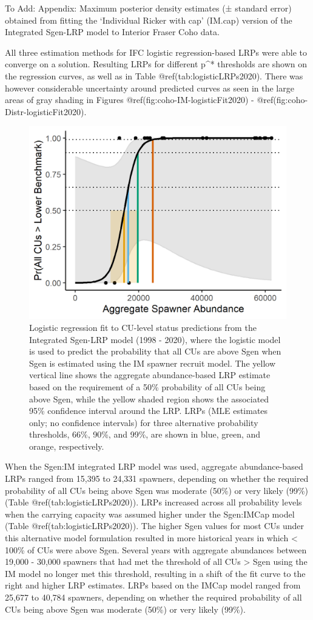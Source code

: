 \documentclass[
]{article}
\begin{document}
To Add: Appendix: Maximum posterior density estimates (± standard error)
obtained from fitting the `Individual Ricker with cap' (IM.cap) version
of the Integrated Sgen-LRP model to Interior Fraser Coho data.

All three estimation methods for IFC logistic regression-based LRPs were
able to converge on a solution. Resulting LRPs for different p\^{}*
thresholds are shown on the regression curves, as well as in Table
@ref(tab:logisticLRPs2020). There was however considerable uncertainty
around predicted curves as seen in the large areas of gray shading in
Figures @ref(fig:coho-IM-logisticFit2020) -
@ref(fig:coho-Distr-logisticFit2020).

\begin{figure}

{\centering \includegraphics[width=0.5\linewidth]{figure/coho-IM2020-LogisticLRP} 

}

\caption{Logistic regression fit to CU-level status predictions from the Integrated Sgen-LRP model (1998 - 2020), where the logistic model is used to predict the probability that all CUs are above Sgen when Sgen is estimated using the IM spawner recruit model. The yellow vertical line shows the aggregate abundance-based LRP estimate based on the requirement of a 50\% probability of all CUs being above Sgen, while the yellow shaded region shows the associated 95\% confidence interval around the LRP. LRPs (MLE estimates only; no confidence intervals) for three alternative probability thresholds, 66\%, 90\%, and 99\%, are shown in blue, green, and orange, respectively.}\label{fig:coho-IM-logisticFit2020}
\end{figure}

When the Sgen:IM integrated LRP model was used, aggregate
abundance-based LRPs ranged from 15,395 to 24,331 spawners, depending on
whether the required probability of all CUs being above Sgen was
moderate (50\%) or very likely (99\%) (Table
@ref(tab:logisticLRPs2020)). LRPs increased across all probability
levels when the carrying capacity was assumed higher under the
Sgen:IMCap model (Table @ref(tab:logisticLRPs2020)). The higher Sgen
values for most CUs under this alternative model formulation resulted in
more historical years in which \textless{} 100\% of CUs were above Sgen.
Several years with aggregate abundances between 19,000 - 30,000 spawners
that had met the threshold of all CUs \textgreater{} Sgen using the IM
model no longer met this threshold, resulting in a shift of the fit
curve to the right and higher LRP estimates. LRPs based on the IMCap
model ranged from 25,677 to 40,784 spawners, depending on whether the
required probability of all CUs being above Sgen was moderate (50\%) or
very likely (99\%).
\end{document}
